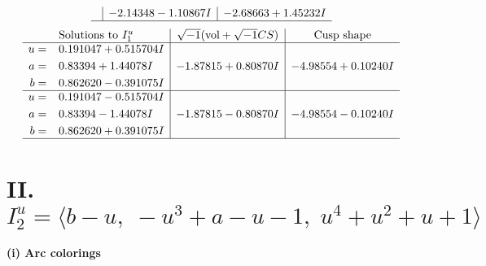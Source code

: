 \documentclass[1p]{elsarticle_modified}
\theoremstyle{definition}
\newcommand{\I}{\sqrt{-1}}
\begin{document}
$$\begin{array}{c|c|c}
 & -2.14348 - 1.10867 I & -2.68663 + 1.45232 I\\
 \hline 
 \end{array}$$\newpage$$\begin{array}{c|c|c}  
\text{Solutions to }I^u_{1}& \I (\text{vol} + \sqrt{-1}CS) & \text{Cusp shape}\\
 \hline 
\begin{aligned}
u &= \phantom{-}0.191047 + 0.515704 I \\
a &= \phantom{-}0.83394 + 1.44078 I \\
b &= \phantom{-}0.862620 - 0.391075 I\end{aligned}
 & -1.87815 + 0.80870 I & -4.98554 + 0.10240 I \\ \hline\begin{aligned}
u &= \phantom{-}0.191047 - 0.515704 I \\
a &= \phantom{-}0.83394 - 1.44078 I \\
b &= \phantom{-}0.862620 + 0.391075 I\end{aligned}
 & -1.87815 - 0.80870 I & -4.98554 - 0.10240 I\\
 \hline 
 \end{array}$$\newpage\newpage\renewcommand{\arraystretch}{1}
\centering \section*{II. $I^u_{2}= \langle b- u,\;- u^3+a- u-1,\;u^4+u^2+u+1 \rangle$}
\flushleft \textbf{(i) Arc colorings}\\
\end{document}
